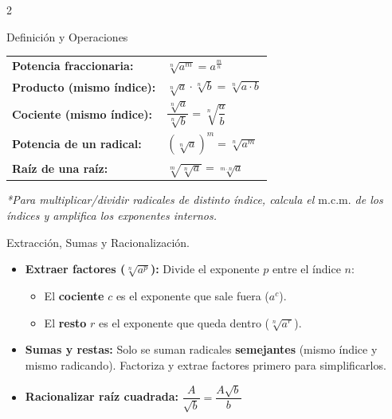 \documentclass[a4paper,11pt]{article}
\begin{document}
\begin{multicols}{2}

\begin{formulabox}{Definición y Operaciones }
\renewcommand{\arraystretch}{1.35}
\begin{tabular}{@{}ll@{}}
\textbf{Potencia fraccionaria:} & $\sqrt[n]{a^{m}} = a^{\frac{m}{n}}$ \\
\textbf{Producto (mismo índice):} & $\sqrt[n]{a} \cdot \sqrt[n]{b} = \sqrt[n]{a \cdot b}$ \\
\textbf{Cociente (mismo índice):} & $\dfrac{\sqrt[n]{a}}{\sqrt[n]{b}} = \sqrt[n]{\dfrac{a}{b}}$ \\
\textbf{Potencia de un radical:} & $\left(\sqrt[n]{a}\right)^{m} = \sqrt[n]{a^{m}}$ \\
\textbf{Raíz de una raíz:} & $\sqrt[m]{\sqrt[n]{a}} = \sqrt[m \cdot n]{a}$
\end{tabular}
\vspace{2pt}
\footnotesize\textit{*Para multiplicar/dividir radicales de distinto índice, calcula el $\text{m.c.m.}$ de los índices y amplifica los exponentes internos.}
\end{formulabox}

\columnbreak

\begin{formulabox}{{Extracción, Sumas y Racionalización.}}
\begin{itemize}[leftmargin=*, itemsep=2pt, topsep=0pt]
    \item \textbf{Extraer factores ($\sqrt[n]{a^{p}}$):} Divide el exponente $p$ entre el índice $n$:
    \begin{itemize}[leftmargin=12pt]
        \item El \textbf{cociente} $c$ es el exponente que sale fuera ($a^{c}$).
        \item El \textbf{resto} $r$ es el exponente que queda dentro ($\sqrt[n]{a^{r}}$).
    \end{itemize}
    \item \textbf{Sumas y restas:} Solo se suman radicales \textbf{semejantes} (mismo índice y mismo radicando). Factoriza y extrae factores primero para simplificarlos.
    \item \textbf{Racionalizar raíz cuadrada:} $\dfrac{A}{\sqrt{b}} = \dfrac{A\sqrt{b}}{b}$
\end{itemize}
\end{formulabox}

\end{multicols}
\end{document}
